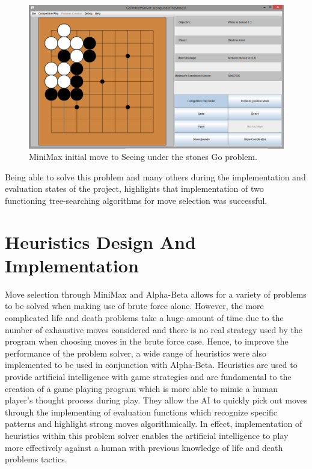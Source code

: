 \documentclass{l3proj}
\begin{document}
\begin{figure}[H]
\centering
\includegraphics[scale=0.5]{Images/UnderTheStones_Minimax.png}
\caption{MiniMax initial move to Seeing under the stones Go problem.}
\end{figure}

Being able to solve this problem and many others during the implementation and evaluation states of the project, highlights that  implementation of two functioning tree-searching algorithms for move selection was successful.

\section{Heuristics Design And Implementation}

Move selection through MiniMax and Alpha-Beta allows for a variety of problems to be solved when making use of brute force alone. However, the more complicated life and death problems take a huge amount of time due to the number of exhaustive moves considered and there is no real strategy used by the program when choosing moves in the brute force case. Hence, to improve the performance of the problem solver, a wide range of heuristics were also implemented to be used in conjunction with Alpha-Beta. Heuristics are used to provide artificial intelligence with game strategies and are fundamental to the creation of a game playing program which is more able to mimic a human player's thought process during play. They allow the AI to quickly pick out moves through the implementing of evaluation functions which recognize specific patterns and highlight strong moves algorithmically. In effect, implementation of heuristics within this problem solver enables the artificial intelligence to play more effectively against a human with previous knowledge of life and death problems tactics.
\end{document}
